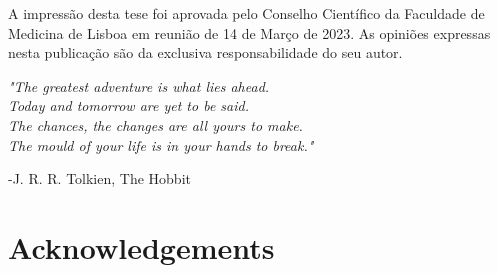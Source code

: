 \documentclass[12pt,a4paper,twoside,openright]{book}
\def\blankpage{%
      \clearpage%
      \thispagestyle{empty}%
      \null%
      \clearpage}
\begin{document}
\begin{sloppy}
\frontmatter


\clearpage \thispagestyle{empty}\mbox{}\clearpage


\clearpage \thispagestyle{empty}\mbox{}\clearpage

\newpage
\thispagestyle{empty}
\vspace*{\fill}
A impressão desta tese foi aprovada pelo Conselho Científico da Faculdade de Medicina de Lisboa em reunião de 14 de Março de 2023. As opiniões expressas nesta publicação são da exclusiva responsabilidade do seu autor.
\blankpage

\newpage
\thispagestyle{empty}
\vspace*{3cm}
\begin{center}
\emph{"The greatest adventure is what lies ahead.\\
Today and tomorrow are yet to be said.\\
The chances, the changes are all yours to make.\\
The mould of your life is in your hands to break."} \\
\end{center} 
\begin{flushright}-J. R. R. Tolkien, The Hobbit\end{flushright}
\clearpage \thispagestyle{empty}\mbox{}\clearpage


\newpage
\thispagestyle{plain}
\chapter*{Acknowledgements}

\clearpage \thispagestyle{empty}\mbox{}\clearpage


\end{sloppy}
\end{document}
